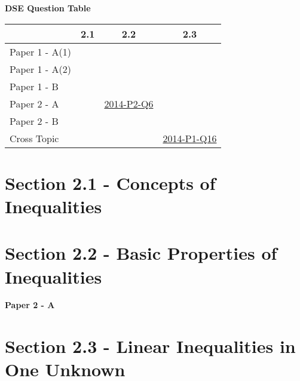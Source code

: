 \documentclass[12pt, a4paper]{article}
\begin{document}
\begin{absolutelynopagebreak}
\begin{center}
\textbf{DSE Question Table}
\end{center}
\begin{center}
\begin{tabular}{|l|c|c|c|}
\hline
        & 2.1 & 2.2 & 2.3 \\\hline
\hline
Paper 1 - A(1)&  &  &  \\
\hline
Paper 1 - A(2)&  &  &  \\
\hline
Paper 1 - B&  &  &  \\
\hline
\hline
Paper 2 - A&  & \hyperref[DSE2014-CoreP2-Q06]{2014-P2-Q6} &  \\
\hline
Paper 2 - B&  &  &  \\
\hline
\hline
Cross Topic&  &  & \hyperref[DSE2014-CoreP1-Q16]{2014-P1-Q16} \\
\hline
\end{tabular}
\end{center}
\end{absolutelynopagebreak}




\section*{Section 2.1 - Concepts of Inequalities}\label{section:3-2-1}





\section*{Section 2.2 - Basic Properties of Inequalities}\label{section:3-2-2}

\textbf{Paper 2 - A}
\begin{enumx}[label=\arabic*.,start=1]
\item {}\label{DSE2014-CoreP2-Q06} 
\end{enumx}




\section*{Section 2.3 - Linear Inequalities in One Unknown}\label{section:3-2-3}
\end{document}
